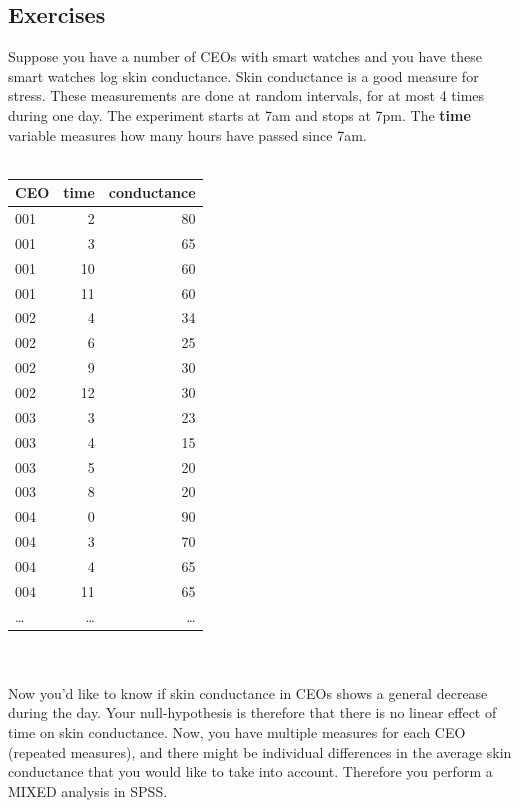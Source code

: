 \documentclass[]{report}\usepackage[]{graphicx}\usepackage[]{color}
\begin{document}
\subsection{Exercises}

Suppose you have a number of CEOs with smart watches and you have these smart watches log skin conductance. Skin conductance is a good measure for stress. These measurements are done at random intervals, for at most 4 times during one day. The experiment starts at 7am and stops at 7pm. The \textbf{time} variable measures how many hours have passed since 7am.
 \\
 \\
 \begin{tabular}{lrr}
 CEO & time & conductance \\ \hline
 001 & 2 & 80 \\
 001 & 3 & 65 \\
 001 & 10 & 60 \\
 001 & 11 & 60 \\
 002 & 4 & 34 \\
 002 & 6 & 25 \\
 002 & 9 & 30 \\
 002 & 12 & 30 \\
 003 & 3 & 23 \\
 003 & 4 & 15 \\
 003 & 5 & 20 \\
 003 & 8 & 20 \\
 004 & 0 & 90 \\
 004 & 3 & 70 \\
 004 & 4 & 65 \\
 004 & 11 & 65 \\
 \dots & \dots & \dots \\
 \end{tabular}
\\
\\
Now you'd like to know if skin conductance in CEOs shows a general decrease during the day. Your null-hypothesis is therefore that there is no linear effect of time on skin conductance. Now, you have multiple measures for each CEO (repeated measures), and there might be individual differences in the average skin conductance that you would like to take into account. Therefore you perform a MIXED analysis in SPSS. 
\end{document}
